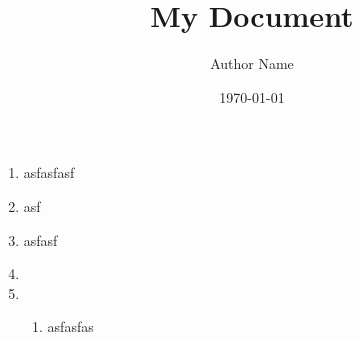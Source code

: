 \documentclass{article}
\title{My Document}\author{Author Name}\date{\today}
\begin{document}
\begin{enumerate}
  \item
        asfasfasf
  \item
        asf
  \item
        asfasf
  \item

  \item
        \begin{enumerate}
          \item
                asfasfas

        \end{enumerate}
\end{enumerate}
\end{document}
